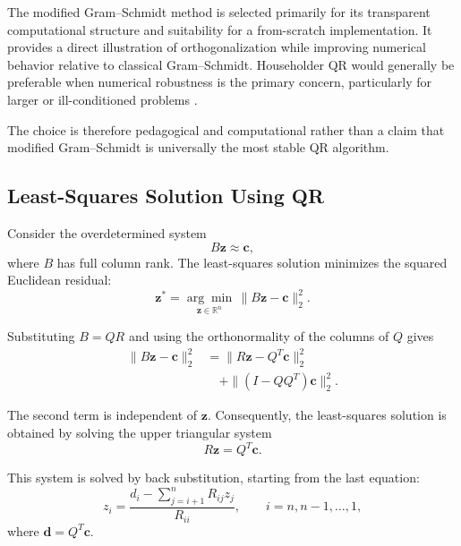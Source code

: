 The modified Gram--Schmidt method is selected primarily for its
transparent computational structure and suitability for a
from-scratch implementation. It provides a direct illustration of
orthogonalization while improving numerical behavior relative to
classical Gram--Schmidt. Householder QR would generally be preferable
when numerical robustness is the primary concern, particularly for
larger or ill-conditioned problems
\cite{golub2013matrix,trefethen1997numerical,higham2002accuracy}.

The choice is therefore pedagogical and computational rather than
a claim that modified Gram--Schmidt is universally the most stable
QR algorithm.

\subsection{Least-Squares Solution Using QR}

Consider the overdetermined system
\begin{equation}
    B\mathbf{z}\approx\mathbf{c},
\end{equation}
where $B$ has full column rank. The least-squares solution minimizes
the squared Euclidean residual:
\begin{equation}
    \mathbf{z}^{*}
    =\underset{\mathbf{z}\in\mathbb{R}^{n}}{\arg\min}
    \,\|B\mathbf{z}-\mathbf{c}\|_2^2.
\end{equation}

Substituting $B=QR$ and using the orthonormality of the columns of
$Q$ gives
\begin{equation}
    \begin{aligned}
        \|B\mathbf{z}-\mathbf{c}\|_2^2
         & =
        \|R\mathbf{z}-Q^T\mathbf{c}\|_2^2 \\
         & \quad+
        \|(I-QQ^T)\mathbf{c}\|_2^2.
    \end{aligned}
    \label{eq:ls-orthogonal-decomposition}
\end{equation}

The second term is independent of $\mathbf{z}$. Consequently, the
least-squares solution is obtained by solving the upper triangular
system
\begin{equation}
    R\mathbf{z}=Q^T\mathbf{c}.
    \label{eq:triangular-system}
\end{equation}

This system is solved by back substitution, starting from the last
equation:
\begin{equation}
    z_i=
    \frac{
        d_i-\displaystyle\sum_{j=i+1}^{n}R_{ij}z_j
    }{R_{ii}},
    \qquad i=n,n-1,\ldots,1,
    \label{eq:back-substitution}
\end{equation}
where $\mathbf{d}=Q^T\mathbf{c}$.


